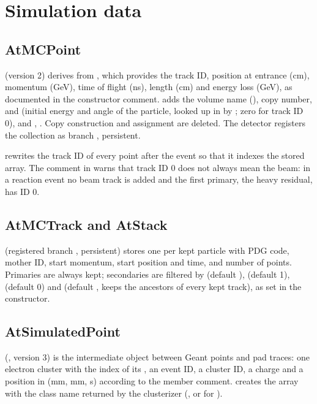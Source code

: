 \section{Simulation data}
\label{sec:dm-sim}

\subsection{AtMCPoint}

 (version 2) derives from , which provides the track ID, position at
entrance (cm), momentum (GeV), time of flight (ns), length (cm) and energy loss (GeV), as documented in
the constructor comment.  adds the volume name (), copy number,
 and  (initial energy and angle of the particle, looked up in
 by ; zero for track ID 0), and ,
. Copy construction and assignment are deleted. The detector  registers
the collection as branch , persistent.

 rewrites the track ID of every point after the event so that it
indexes the stored  array. The comment in  warns that track
ID 0 does not always mean the beam: in a reaction event no beam track is added and the first primary,
the heavy residual, has ID 0.

\subsection{AtMCTrack and AtStack}

 (registered branch , persistent) stores one  per kept
particle with PDG code, mother ID, start momentum, start position and time, and number of points.
Primaries are always kept; secondaries are filtered by  (default ),
 (default 1),  (default 0) and  (default
, keeps the ancestors of every kept track), as set in the  constructor.

\subsection{AtSimulatedPoint}

 (, version 3) is the intermediate object between Geant
points and pad traces: one electron cluster with the index of its , an event ID, a
cluster ID, a charge and a position in (mm, mm, \textmu s) according to the member comment.
 creates the array with the class name returned by the clusterizer
(, or  for ).

